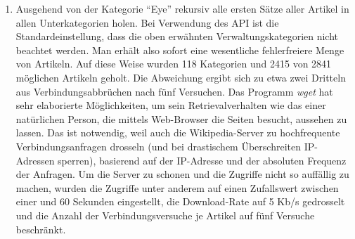 \documentclass[pagesize,paper=A4,DIV=calc,fontsize=12pt,draft=false]{scrreprt}
\begin{document}
\begin{enumerate}
\item Ausgehend von der Kategorie \enquote{Eye} rekursiv alle ersten Sätze aller Artikel in allen Unterkategorien holen. 
Bei Verwendung des API ist die Standardeinstellung, dass die oben erwähnten Verwaltungskategorien nicht beachtet werden. 
Man erhält also sofort eine wesentliche fehlerfreiere Menge von Artikeln. 
Auf diese Weise wurden 118 Kategorien und 2415 von 2841 möglichen Artikeln geholt. 
Die Abweichung ergibt sich zu etwa zwei Dritteln aus Verbindungsabbrüchen nach fünf Versuchen. 
Das Programm \emph{wget} hat sehr elaborierte Möglichkeiten, um sein Retrievalverhalten wie das einer natürlichen Person, die mittels Web-Browser die Seiten besucht, aussehen zu lassen. 
Das ist notwendig, weil auch die Wikipedia-Server zu hochfrequente Verbindungsanfragen drosseln (und bei drastischem Überschreiten IP-Adressen sperren), basierend auf der IP-Adresse und der absoluten Frequenz der Anfragen. 
Um die Server zu schonen und die Zugriffe nicht so auffällig zu machen, wurden die Zugriffe unter anderem auf einen Zufallswert zwischen einer und 60 Sekunden eingestellt, die Download-Rate auf 5 Kb/s gedrosselt und die Anzahl der Verbindungsversuche je Artikel auf fünf Versuche beschränkt. 


\end{enumerate}
\end{document}
